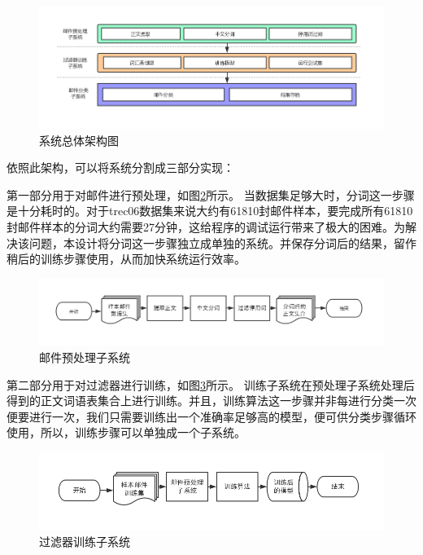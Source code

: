 \documentclass[UTF8,zihao=-4]{ctexart}
\begin{document}
	\begin{figure}[H]
		\centering
		\setlength{\abovecaptionskip}{0.cm}
		\setlength{\belowcaptionskip}{-0.cm}
		\includegraphics[scale=0.5]{pictures/系统总体架构图.png}
		\caption{系统总体架构图}
		\label{fig:overall-structure}
	\end{figure}

	依照此架构，可以将系统分割成三部分实现：
	
	第一部分用于对邮件进行预处理，如图\ref{fig:preprocess-system}所示。
	当数据集足够大时，分词这一步骤是十分耗时的。对于trec06数据集来说大约有61810封邮件样本，要完成所有61810封邮件样本的分词大约需要27分钟，这给程序的调试运行带来了极大的困难。为解决该问题，本设计将分词这一步骤独立成单独的系统。并保存分词后的结果，留作稍后的训练步骤使用，从而加快系统运行效率。
	\begin{figure}[H]
		\centering
		\setlength{\abovecaptionskip}{0.cm}
		\setlength{\belowcaptionskip}{-0.cm}
		\includegraphics[scale=0.45]{pictures/邮件预处理子系统.png}
		\caption{邮件预处理子系统}
		\label{fig:preprocess-system}
	\end{figure}
	
	第二部分用于对过滤器进行训练，如图\ref{fig:train-system}所示。
	训练子系统在预处理子系统处理后得到的正文词语表集合上进行训练。并且，训练算法这一步骤并非每进行分类一次便要进行一次，我们只需要训练出一个准确率足够高的模型，便可供分类步骤循环使用，所以，训练步骤可以单独成一个子系统。
	\begin{figure}[H]
		\centering
		\setlength{\abovecaptionskip}{0.cm}
		\setlength{\belowcaptionskip}{-0.cm}
		\includegraphics[scale=0.45]{pictures/邮件训练子系统.png}
		\caption{过滤器训练子系统}
		\label{fig:train-system}
	\end{figure}
		
\end{document}
